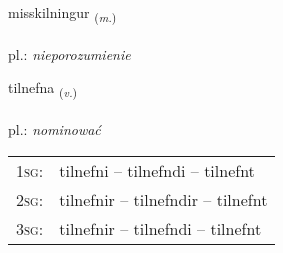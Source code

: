 \documentclass[frontgrid, backgrid]{flacards}\usepackage[]{graphicx}\usepackage[]{xcolor}
\begin{document}
\renewcommand{\flhead}{\vskip5pt \fboxsep=0pt {\small\bfseries\footnotesize Nafnorð | rzeczownik}}
\renewcommand{\fcfoot}{\vskip5pt \fboxsep=0pt \hspace{2pt}{\small\bfseries\footnotesize 3K}}

\renewcommand{\blhead}{\vskip5pt {\small\bfseries\footnotesize Nafnorð | rzeczownik }}
\renewcommand{\bcfoot}{\vskip5pt \hspace{2pt}{\small\bfseries\footnotesize 3K}}


{misskilningur \small{\textsubscript{(\textit{m.})}} \\[1ex] %
\textphonetic{[mɪːscɪlniŋkʏr]} \\
pl.: \emph{nieporozumienie} \\  [2ex]
\renewcommand*{\arraystretch}{0.8}
}

\renewcommand{\flhead}{\vskip5pt \fboxsep=0pt {\small\bfseries\footnotesize Sagnorð | czasownik}}
\renewcommand{\fcfoot}{\vskip5pt \fboxsep=0pt \hspace{2pt}{\small\bfseries\footnotesize 3K}}

\renewcommand{\blhead}{\vskip5pt {\small\bfseries\footnotesize Sagnorð | czasownik }}
\renewcommand{\bcfoot}{\vskip5pt \hspace{2pt}{\small\bfseries\footnotesize 3K}}


{tilnefna \small{\textsubscript{(\textit{v.})}} \\[1ex] %
\textphonetic{[tʰɪlnɛpna]} \\
pl.: \emph{nominować} \\  [2ex]
\renewcommand*{\arraystretch}{0.8}
\begin{tabular}{p{1cm}l}
\textsc{1sg}: & tilnefni -- tilnefndi -- tilnefnt \\ 
\textsc{2sg}: & tilnefnir -- tilnefndir -- tilnefnt \\ 
\textsc{3sg}: & tilnefnir -- tilnefndi -- tilnefnt \\ 
\end{tabular}
}
\end{document}
